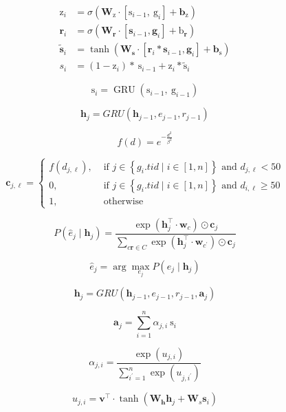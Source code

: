 $$\begin{aligned} \mathrm{z}_{i} &=\sigma\left(\mathbf{W}_{\mathrm{z}} \cdot\left[\mathrm{s}_{i-1}, \mathrm{~g}_{i}\right]+\mathbf{b}_{\mathrm{z}}\right) \\ \mathbf{r}_{i} &=\sigma\left(\mathbf{W}_{\mathbf{r}} \cdot\left[\mathbf{s}_{i-1}, \mathbf{g}_{i}\right]+\mathrm{b}_{\mathbf{r}}\right) \\ \tilde{\mathbf{s}}_{i} &=\tanh \left(\mathbf{W}_{\mathbf{s}} \cdot\left[\mathbf{r}_{i} * \mathbf{s}_{i-1}, \mathbf{g}_{i}\right]+\mathbf{b}_{\mathrm{s}}\right) \\ s_{i} &=\left(1-\mathrm{z}_{i}\right) * \mathrm{~s}_{i-1}+\mathrm{z}_{i} * \tilde{\mathrm{s}}_{i} \end{aligned}$$

$$ \mathrm{s}_{i}=\operatorname{GRU}\left(\mathrm{s}_{i-1}, \mathrm{~g}_{i-1}\right) $$

$$ \mathbf{h}_{j}=G R U\left(\mathbf{h}_{j-1}, e_{j-1}, r_{j-1}\right) $$

$$ f(d)=e^{-\frac{d^{2}}{\beta^{2}}} $$

$$
\mathbf{c}_{j, \ell}= \begin{cases}f\left(d_{j, \ell}\right), & \text { if } j \in\left\{g_{i} . t i d \mid i \in[1, n]\right\} \text { and } d_{j, \ell}<50 \\ 0, & \text { if } j \in\left\{g_{i} . t i d \mid i \in[1, n]\right\} \text { and } d_{i, \ell} \geq 50 \\ 1, & \text { otherwise }\end{cases}
$$

$$
P\left(\hat{e}_{j} \mid \mathbf{h}_{j}\right)=\frac{\exp \left(\mathbf{h}_{j}^{\top} \cdot \mathbf{w}_{c}\right) \odot \mathbf{c}_{j}}{\sum_{c \boldsymbol{r} \in C} \exp \left(\mathbf{h}_{j}^{\top} \cdot \mathbf{w}_{c^{\prime}}\right) \odot \mathbf{c}_{j}}
$$

$$\hat{e}_j = \arg \max_{e_j} P\left({e}_{j} \mid \mathbf{h}_{j}\right)$$

$$ \mathbf{h}_{j}=G R U\left(\mathbf{h}_{j-1}, e_{j-1}, r_{j-1}, \mathbf{a}_{j}\right) $$

$$
\mathbf{a}_{j}=\sum_{i=1}^{n} \alpha_{j, i} \mathrm{~s}_{i}
$$

$$
\alpha_{j, i}=\frac{\exp \left(u_{j, i}\right)}{\sum_{i^{\prime}=1}^{n} \exp \left(u_{j, i^{\prime}}\right)}
$$

$$
u_{j, i}=\mathbf{v}^{\top} \cdot \tanh \left(\mathbf{W}_{\mathbf{h}} \mathbf{h}_{j}+\mathbf{W}_{s} \mathbf{s}_{i}\right)
$$

